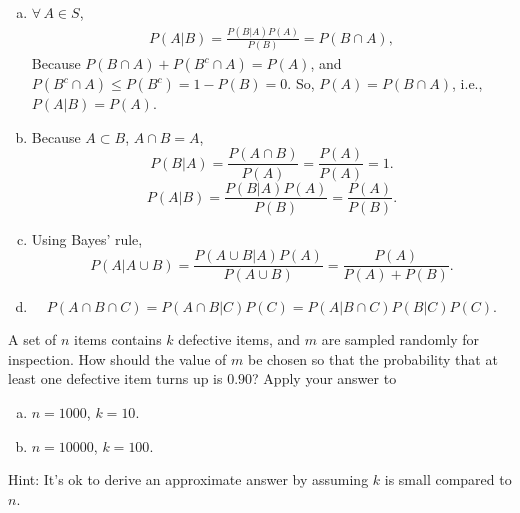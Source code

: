 \documentclass[14pt]{elegantbook}
\begin{document}
    \begin{solution}
        \begin{enumerate}[(a)]
            \item $\forall\,A\in S$, \begin{align*}
                P(A|B)=\frac{P(B|A)P(A)}{P(B)}=P(B\cap A), 
            \end{align*}
            Because $P(B\cap A)+P(B^c\cap A)=P(A)$, and $P(B^c\cap A)\leq P(B^c)=1-P(B)=0$. So, $P(A)=P(B\cap A)$, i.e., $P(A|B)=P(A)$. 
            \item Because $A\subset B$, $A\cap B=A$, 
            \[
                P(B|A)=\frac{P(A\cap B)}{P(A)}=\frac{P(A)}{P(A)}=1. 
            \]
            \[
                P(A|B)=\frac{P(B|A)P(A)}{P(B)}=\frac{P(A)}{P(B)}. 
            \]
            \item Using Bayes' rule,
            \[
                P(A|A\cup B)=\frac{P(A\cup B|A)P(A)}{P(A\cup B)}=\frac{P(A)}{P(A)+P(B)}. 
            \]
            \item \[
                P(A\cap B\cap C)=P(A\cap B|C)P(C)=P(A|B\cap C)P(B|C)P(C). 
            \]
        \end{enumerate}
    \end{solution}

    \begin{exercise*}[2]
        A set of $n$ items contains $k$ defective items, and $m$ are sampled randomly for inspection. How should the value of $m$ be chosen so that the probability that at least one defective item turns up is $0.90$? Apply your answer to 
        \begin{enumerate}[(a)]
            \item $n=1000$, $k=10$. 
            \item $n=10000$, $k=100$.
        \end{enumerate}
        Hint: It's ok to derive an approximate answer by assuming $k$ is small compared to $n$. 
    \end{exercise*}
\end{document}
